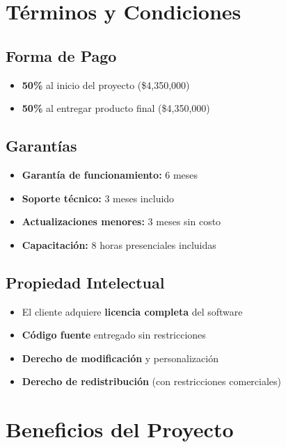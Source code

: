 \documentclass[12pt,a4paper]{article}
\begin{document}
\section{Términos y Condiciones}

\subsection{Forma de Pago}

\begin{itemize}
    \item \textbf{50\%} al inicio del proyecto (\$4,350,000)
    \item \textbf{50\%} al entregar producto final (\$4,350,000)
\end{itemize}

\subsection{Garantías}

\begin{itemize}
    \item \textbf{Garantía de funcionamiento:} 6 meses
    \item \textbf{Soporte técnico:} 3 meses incluido
    \item \textbf{Actualizaciones menores:} 3 meses sin costo
    \item \textbf{Capacitación:} 8 horas presenciales incluidas
\end{itemize}

\subsection{Propiedad Intelectual}

\begin{itemize}
    \item El cliente adquiere \textbf{licencia completa} del software
    \item \textbf{Código fuente} entregado sin restricciones
    \item \textbf{Derecho de modificación} y personalización
    \item \textbf{Derecho de redistribución} (con restricciones comerciales)
\end{itemize}

\section{Beneficios del Proyecto}
\end{document}
